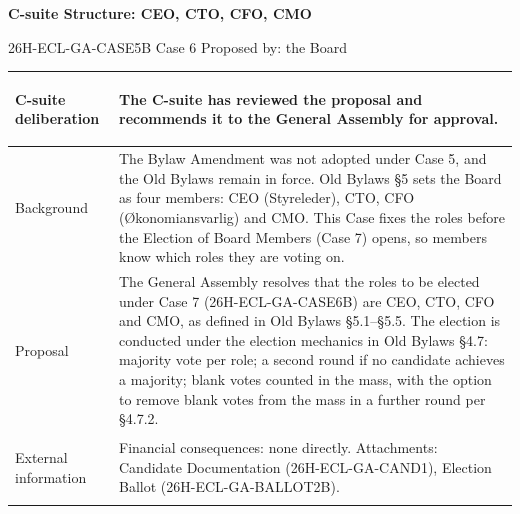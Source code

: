 \documentclass{../../../Common/Latex/Templates/rapport}
\begin{document}
\reportmainmatter
\small
\setlength{\parindent}{0pt}
\setlength{\tabcolsep}{6pt}
\renewcommand{\arraystretch}{1.2}

\begin{center}
  {\Large\bfseries C-suite Structure: CEO, CTO, CFO, CMO}\par
  \vspace{0.15cm}
  {\normalsize 26H-ECL-GA-CASE5B \textperiodcentered{} Case 6 \textperiodcentered{} Proposed by: the Board}\par
  \vspace{0.1cm}
  {\small \meetingline}\par
\end{center}

\vspace{0.3cm}
\begin{tabularx}{\textwidth}{|>{\bfseries\raggedright\arraybackslash}p{4.2cm}|X|}
  \hline
  C-suite deliberation & The C-suite has reviewed the proposal and recommends it to the General Assembly for approval. \\
  \hline
  Background           & The Bylaw Amendment was not adopted under Case 5, and the Old Bylaws remain in force. Old Bylaws \S5 sets the Board as four members: CEO (Styreleder), CTO, CFO (Økonomiansvarlig) and CMO. This Case fixes the roles before the Election of Board Members (Case 7) opens, so members know which roles they are voting on. \\
  \hline
  Proposal             & The General Assembly resolves that the roles to be elected under Case 7 (26H-ECL-GA-CASE6B) are CEO, CTO, CFO and CMO, as defined in Old Bylaws \S5.1--\S5.5. The election is conducted under the election mechanics in Old Bylaws \S4.7: majority vote per role; a second round if no candidate achieves a majority; blank votes counted in the mass, with the option to remove blank votes from the mass in a further round per \S4.7.2. \\
  \hline
  External information & Financial consequences: none directly. Attachments: Candidate Documentation (26H-ECL-GA-CAND1), Election Ballot (26H-ECL-GA-BALLOT2B). \\
  \hline
\end{tabularx}
\end{document}
